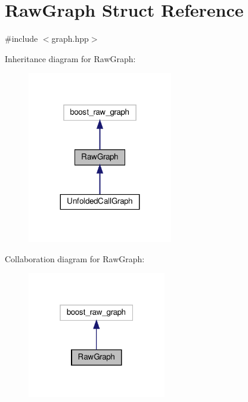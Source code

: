 \hypertarget{structRawGraph}{}\section{Raw\+Graph Struct Reference}
\label{structRawGraph}


{\ttfamily \#include $<$graph.\+hpp$>$}



Inheritance diagram for Raw\+Graph\+:
\nopagebreak
\begin{figure}[H]
\begin{center}
\leavevmode
\includegraphics[width=179pt]{d1/ddc/structRawGraph__inherit__graph}
\end{center}
\end{figure}


Collaboration diagram for Raw\+Graph\+:
\nopagebreak
\begin{figure}[H]
\begin{center}
\leavevmode
\includegraphics[width=171pt]{df/d85/structRawGraph__coll__graph}
\end{center}
\end{figure}
